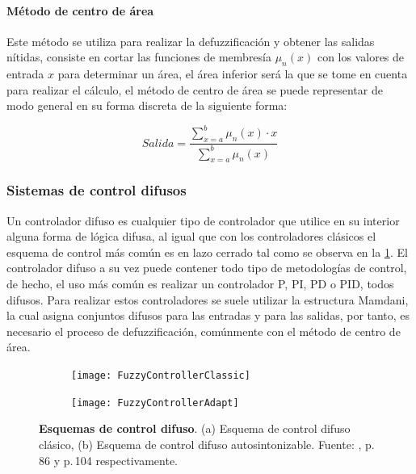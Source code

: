 			\paragraph{Método de centro de área}

				Este método se utiliza para realizar la defuzzificación y obtener las salidas nítidas, consiste en cortar las funciones de membresía $\mu_{n}(x)$ con los valores de entrada $x$ para determinar un área, el área inferior será la que se tome en cuenta para realizar el cálculo, el método de centro de área se puede representar de modo general en su forma discreta de la siguiente forma:
				
				\begin{equation}\label{eq:Centroide}
				Salida = \frac{\displaystyle\sum\limits_{x=a}^{b}\mu_{n}(x)\cdot x}{\displaystyle\sum\limits_{x=a}^{b}\mu_{n}(x)}
				\end{equation}
	
		\subsubsection{Sistemas de control difusos}
			
			Un controlador difuso es cualquier tipo de controlador que utilice en su interior alguna forma de lógica difusa, al igual que con los controladores clásicos el esquema de control más común es en lazo cerrado tal como se observa en la \cref{fig:fuzzycontrollerclassic}. El controlador difuso a su vez puede contener todo tipo de metodologías de control, de hecho, el uso más común es realizar un controlador P, PI, PD o PID, todos difusos. Para realizar estos controladores se suele utilizar la estructura Mamdani, la cual asigna conjuntos difusos para las entradas y para las salidas, por tanto, es necesario el proceso de defuzzificación, comúnmente con el método de centro de área.
					
			\begin{figure}[htb]
				\centering
				\begin{subfigure}[t]{0.8\textwidth}
					\centering
					\texttt{[image: FuzzyControllerClassic]} %
					\caption{} 
					\label{fig:fuzzycontrollerclassic}
				\end{subfigure}
				\hfill
				\begin{subfigure}[t]{0.8\textwidth}
					\centering
					\texttt{[image: FuzzyControllerAdapt]} %
					\caption{}
					\label{fig:fuzzycontrolleradapt}
				\end{subfigure}
				
				\caption[Esquemas de control difuso]{\textbf{Esquemas de control difuso}. (a) Esquema de control difuso clásico, (b) Esquema de control difuso autosintonizable. Fuente: \textcite{cruz2010inteligencia}, p.$\,$86 y p.$\,$104 respectivamente. \label{fig:FuzzySchems}}
			\end{figure}
			
